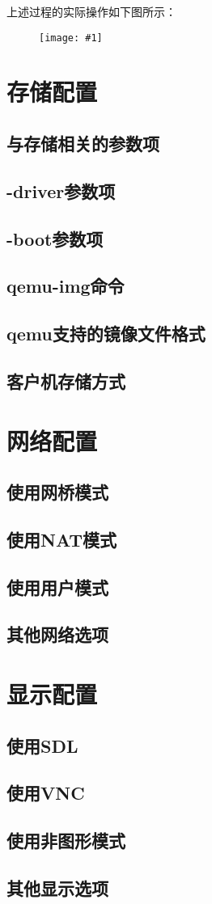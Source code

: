 \documentclass[a4paper,left=2.5cm,right=2.5cm,11pt]{article}
\newcommand{\fic}[1]{\begin{figure}[H]
		\center
		\texttt{[image: \#1]}
	\end{figure}}
\begin{document}
	上述过程的实际操作如下图所示：
	\fic{6.png}

\clearpage

\section{存储配置}
\subsection{与存储相关的参数项}
\subsection{-driver参数项}
\subsection{-boot参数项}
\subsection{qemu-img命令}
\subsection{qemu支持的镜像文件格式}
\subsection{客户机存储方式}

\clearpage

\section{网络配置}
\subsection{使用网桥模式}
\subsection{使用NAT模式}
\subsection{使用用户模式}
\subsection{其他网络选项}

\clearpage

\section{显示配置}
\subsection{使用SDL}
\subsection{使用VNC}
\subsection{使用非图形模式}
\subsection{其他显示选项}
\end{document}
